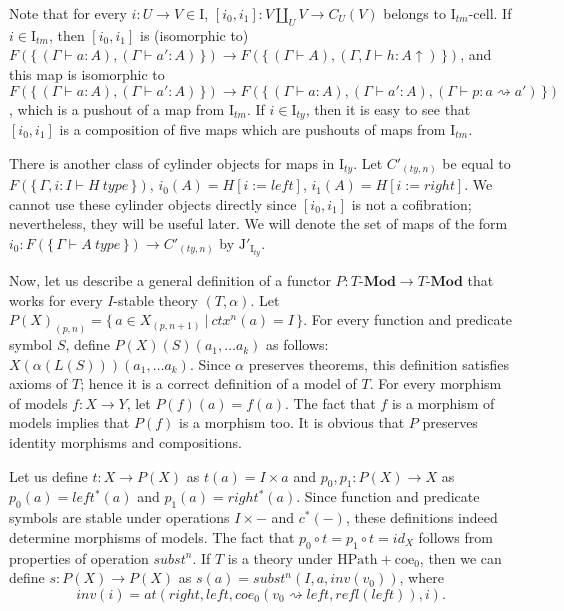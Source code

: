 \documentclass[reqno]{amsart}
\theoremstyle{definition}
\theoremstyle{remark}
\newcommand{\repl}{:=}
\newcommand{\idtype}{\rightsquigarrow}
\newcommand{\coe}{\mathrm{coe}}
\newcommand{\HPath}{\mathrm{HPath}}
\newcommand{\cat}[1]{\mathbf{#1}}
\newcommand{\Mod}[1]{#1\text{-}\cat{Mod}}
\newcommand{\I}{\mathrm{I}}
\newcommand{\J}{\mathrm{J}}
\newcommand{\class}[2]{#1\text{-}\mathrm{#2}}
\newcommand{\Icell}[1][\I]{\class{#1}{cell}}
\newcommand{\cyli}{i}
\numberwithin{figure}{section}
\begin{document}
Note that for every $i : U \to V \in \I$, $[\cyli_0,\cyli_1] : V \amalg_U V \to C_U(V)$ belongs to $\Icell[\I_{tm}]$.
If $i \in \I_{tm}$, then $[\cyli_0,\cyli_1]$ is (isomorphic to) $F(\{\,(\Gamma \vdash a : A), (\Gamma \vdash a' : A)\,\}) \to F(\{\,(\Gamma \vdash A), (\Gamma, I \vdash h : A\!\uparrow)\,\})$,
and this map is isomorphic to $F(\{\,(\Gamma \vdash a : A), (\Gamma \vdash a' : A)\,\}) \to F(\{\,(\Gamma \vdash a : A), (\Gamma \vdash a' : A), (\Gamma \vdash p : a \idtype a')\,\})$,
which is a pushout of a map from $\I_{tm}$.
If $i \in \I_{ty}$, then it is easy to see that $[\cyli_0,\cyli_1]$ is a composition of five maps which are pushouts of maps from $\I_{tm}$.

There is another class of cylinder objects for maps in $\I_{ty}$.
Let $C'_{(ty,n)}$ be equal to $F(\{\,\Gamma, i : I \vdash H\ type\,\})$, $\cyli_0(A) = H[i \repl left]$, $\cyli_1(A) = H[i \repl right]$.
We cannot use these cylinder objects directly since $[\cyli_0,\cyli_1]$ is not a cofibration; nevertheless, they will be useful later.
We will denote the set of maps of the form $\cyli_0 : F(\{\,\Gamma \vdash A\ type\,\}) \to C'_{(ty,n)}$ by $\J'_{\I_{ty}}$.

Now, let us describe a general definition of a functor $P : \Mod{T} \to \Mod{T}$ that works for every $I$-stable theory $(T,\alpha)$.
Let $P(X)_{(p,n)} = \{\,a \in X_{(p,n+1)}\ |\ ctx^n(a) = I\,\}$.
For every function and predicate symbol $S$, define $P(X)(S)(a_1, \ldots a_k)$ as follows: $X(\alpha(L(S)))(a_1, \ldots a_k)$.
Since $\alpha$ preserves theorems, this definition satisfies axioms of $T$; hence it is a correct definition of a model of $T$.
For every morphism of models $f : X \to Y$, let $P(f)(a) = f(a)$.
The fact that $f$ is a morphism of models implies that $P(f)$ is a morphism too.
It is obvious that $P$ preserves identity morphisms and compositions.

Let us define $t : X \to P(X)$ as $t(a) = I \times a$ and $p_0,p_1 : P(X) \to X$ as $p_0(a) = left^*(a)$ and $p_1(a) = right^*(a)$.
Since function and predicate symbols are stable under operations $I \times -$ and $c^*(-)$, these definitions indeed determine morphisms of models.
The fact that $p_0 \circ t = p_1 \circ t = id_X$ follows from properties of operation $subst^n$.
If $T$ is a theory under $\HPath + \coe_0$, then we can define $s : P(X) \to P(X)$ as $s(a) = subst^n(I, a, inv(v_0))$, where
\[ inv(i) = at(right, left, coe_0(v_0 \idtype left, refl(left)), i). \]
\end{document}
